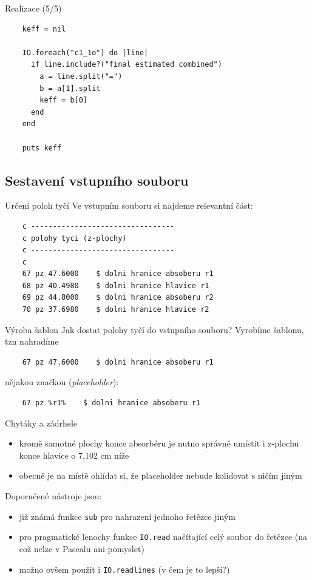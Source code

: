 \documentclass{beamer}
\begin{document}
\begin{frame}[fragile]{Realizace (5/5)}
  \scriptsize
  \begin{verbatim}
    keff = nil

    IO.foreach("c1_1o") do |line|
      if line.include?("final estimated combined")
        a = line.split("=")
        b = a[1].split
        keff = b[0]
      end
    end

    puts keff
  \end{verbatim}
\end{frame}


\subsection{Sestavení vstupního souboru}

\begin{frame}[fragile]{Určení poloh tyčí}
  Ve vstupním souboru si najdeme relevantní část:
  \scriptsize
  \begin{verbatim}
    c ---------------------------------
    c polohy tyci (z-plochy)
    c ---------------------------------
    c
    67 pz 47.6000    $ dolni hranice absoberu r1
    68 pz 40.4980    $ dolni hranice hlavice r1
    69 pz 44.8000    $ dolni hranice absoberu r2
    70 pz 37.6980    $ dolni hranice hlavice r2
  \end{verbatim}
\end{frame}

\begin{frame}[fragile]{Výroba šablon}
  Jak dostat polohy tyčí do vstupního souboru? Vyrobíme šablonu, tzn nahradíme
  \begin{verbatim}
    67 pz 47.6000    $ dolni hranice absoberu r1
  \end{verbatim}
  \pause
  nějakou značkou (\emph{placeholder}):
  \begin{verbatim}
    67 pz %r1%    $ dolni hranice absoberu r1
  \end{verbatim}
\end{frame}

\begin{frame}{Chytáky a zádrhele}
  \begin{itemize}
    \item kromě samotné plochy konce absorbéru je nutno správně umístit i z-plochu konce hlavice o 7,102 cm níže
    \item obecně je na místě ohlídat si, že placeholder nebude kolidovat s ničím jiným
  \end{itemize}
  Doporučené nástroje jsou:
  \begin{itemize}
    \item již známá funkce \texttt{sub} pro nahrazení jednoho řetězce jiným
    \item pro pragmatické lenochy funkce \texttt{IO.read} načítající celý soubor do řetězce (na což nelze v Pascalu ani pomyslet)
    \item možno ovšem použít i \texttt{IO.readlines} (v čem je to lepší?)
  \end{itemize}
\end{frame}
\end{document}
